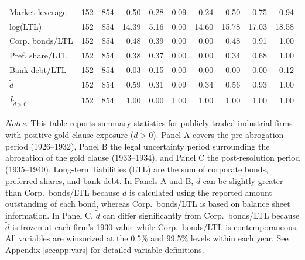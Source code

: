\begin{table}[p]
\begin{threeparttable}
\begin{tabular}{lrrrrrrrrr}
            Market leverage & 152 & 854 & 0.50 & 0.28 & 0.09 & 0.24 & 0.50 & 0.75 & 0.94 \\
            log(LTL) & 152 & 854 & 14.39 & 5.16 & 0.00 & 14.60 & 15.78 & 17.03 & 18.58 \\
            Corp. bonds/LTL & 152 & 854 & 0.48 & 0.39 & 0.00 & 0.00 & 0.48 & 0.91 & 1.00 \\
            Pref. share/LTL & 152 & 854 & 0.38 & 0.37 & 0.00 & 0.00 & 0.34 & 0.68 & 1.00 \\
            Bank debt/LTL & 152 & 854 & 0.03 & 0.15 & 0.00 & 0.00 & 0.00 & 0.00 & 0.12 \\
            \ensuremath{\tilde{d}} & 152 & 854 & 0.59 & 0.31 & 0.09 & 0.34 & 0.56 & 0.93 & 1.00 \\
            \ensuremath{I_{\tilde{d}>0}} & 152 & 854 & 1.00 & 0.00 & 1.00 & 1.00 & 1.00 & 1.00 & 1.00 \\
            \bottomrule
        \end{tabular}
    \end{threeparttable}

    \vspace*{3mm} \justifying \noindent
\scriptsize{\textit{Notes.} This table reports summary statistics for publicly traded industrial firms with positive gold clause exposure ($\tilde{d} > 0$). Panel A covers the pre-abrogation period (1926--1932), Panel B the legal uncertainty period surrounding the abrogation of the gold clause (1933--1934), and Panel C the post-resolution period (1935--1940). Long-term liabilities (LTL) are the sum of corporate bonds, preferred shares, and bank debt. In Panels A and B, $\tilde{d}$ can be slightly greater than Corp.\ bonds/LTL because $\tilde{d}$ is calculated using the reported amount outstanding of each bond, whereas Corp.\ bonds/LTL is based on balance sheet information. In Panel C, $\tilde{d}$ can differ significantly from Corp.\ bonds/LTL because $\tilde{d}$ is frozen at each firm's 1930 value while Corp.\ bonds/LTL is contemporaneous. All variables are winsorized at the 0.5\% and 99.5\% levels within each year. See Appendix \ref{secapp:vars} for detailed variable definitions.}
\end{table}
